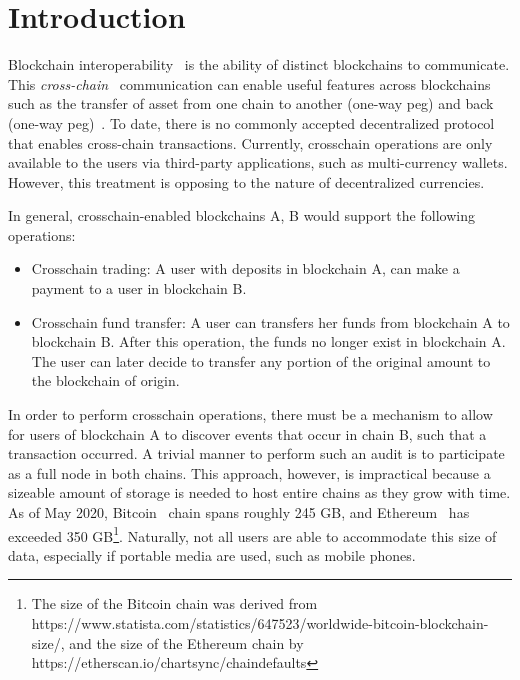 \section{Introduction}

Blockchain interoperability~\cite{dionyziz} is the ability of distinct
blockchains to communicate.  This \emph{cross-chain}~\cite{pow-sidechains,
pos-sidechains,burn,crosschain-sok, gtklocker} communication can enable useful
features across blockchains such as the transfer of asset from one chain to
another (one-way peg) and back (one-way peg)~\cite{pow-sidechains}. To date,
there is no commonly accepted decentralized protocol that enables cross-chain
transactions. Currently, crosschain operations are only available to the users
via third-party applications, such as multi-currency wallets. However, this
treatment is opposing to the nature of decentralized currencies.

\noindent

In general, crosschain-enabled blockchains A, B would support the following
operations:

\begin{itemize}
\item Crosschain trading: A user with deposits in blockchain A, can make a
    payment to a user in blockchain B.
\item Crosschain fund transfer: A user can transfers her funds from blockchain
    A to blockchain B. After this operation, the funds no longer exist in
    blockchain A. The user can later decide to transfer any portion of the
    original amount to the blockchain of origin.
\end{itemize}


\noindent

In order to perform crosschain operations, there must be a mechanism to allow
for users of blockchain A to discover events that occur in chain B, such that a
transaction occurred. A trivial manner to perform such an audit is to
participate as a full node in both chains. This approach, however, is
impractical because a sizeable amount of storage is needed to host entire
chains as they grow with time. As of May 2020, Bitcoin~\cite{nakamoto} chain
spans roughly 245 GB, and Ethereum~\cite{wood, buterin} has exceeded 350
GB\footnote{The size of the Bitcoin chain was derived from
    https://www.statista.com/statistics/647523/worldwide-bitcoin-blockchain-size/,
    and the size of the Ethereum chain by
https://etherscan.io/chartsync/chaindefaults}. Naturally, not all users are
able to accommodate this size of data, especially if portable media are used,
such as mobile phones.

